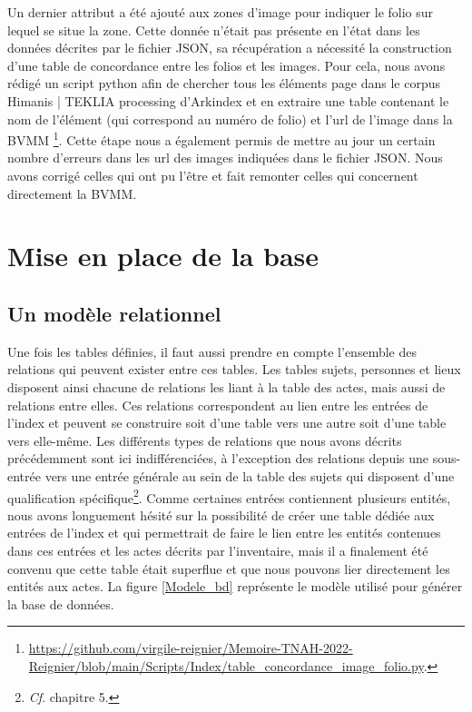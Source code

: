 \documentclass[a4paper,12pt,twoside]{book}
\begin{document}
	Un dernier attribut a été ajouté aux zones d'image pour indiquer le folio sur lequel se situe la zone. Cette donnée n'était pas présente en l'état dans les données décrites par le fichier JSON, sa récupération a nécessité la construction d'une table de concordance entre les folios et les images. Pour cela, nous avons rédigé un script python afin de chercher tous les éléments \og page\fg{} dans le corpus \og Himanis | TEKLIA processing\fg{} d'Arkindex et en extraire une table contenant le nom de l'élément (qui correspond au numéro de folio) et l'url de l'image dans la BVMM \footnote{\url{https://github.com/virgile-reignier/Memoire-TNAH-2022-Reignier/blob/main/Scripts/Index/table_concordance_image_folio.py}.}. Cette étape nous a également permis de mettre au jour un certain nombre d'erreurs dans les url des images indiquées dans le fichier JSON. Nous avons corrigé celles qui ont pu l'être et fait remonter celles qui concernent directement la BVMM.
	
	\section{Mise en place de la base}
	
	\subsection{Un modèle relationnel}

	Une fois les tables définies, il faut aussi prendre en compte l'ensemble des relations qui peuvent exister entre ces tables. Les tables sujets, personnes et lieux disposent ainsi chacune de relations les liant à la table des actes, mais aussi de relations entre elles. Ces relations correspondent au lien entre les entrées de l'index et peuvent se construire soit d'une table vers une autre soit d'une table vers elle-même. Les différents types de relations que nous avons décrits précédemment sont ici indifférenciées, à l'exception des relations depuis une sous-entrée vers une entrée générale au sein de la table des sujets qui disposent d'une qualification spécifique\footnote{\textit{Cf}. chapitre 5.}. Comme certaines entrées contiennent plusieurs entités, nous avons longuement hésité sur la possibilité de créer une table dédiée aux entrées de l'index et qui permettrait de faire le lien entre les entités contenues dans ces entrées et les actes décrits par l'inventaire, mais il a finalement été convenu que cette table était superflue et que nous pouvons lier directement les entités aux actes. La figure \ref{Modele_bd} représente le modèle utilisé pour générer la base de données.
	
\end{document}
